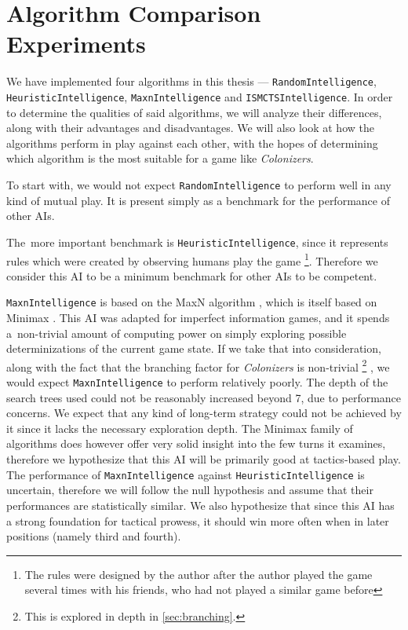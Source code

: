\section{Algorithm Comparison Experiments}

We have implemented four algorithms in this thesis --- \texttt{RandomIntelligence},
\texttt{HeuristicIntelligence}, \texttt{MaxnIntelligence} and \texttt{ISMCTSIntelligence}.
In order to determine the qualities of said algorithms, we will analyze their differences,
along with their advantages and disadvantages. We will also look at how the algorithms
perform in play against each other, with the hopes of determining which algorithm
is the most suitable for a game like \emph{Colonizers}.

To start with, we would not expect \texttt{RandomIntelligence} to perform well in any
kind of mutual play. It is present simply as a benchmark for the performance of
other AIs.

The~more important benchmark is \texttt{HeuristicIntelligence}, since it represents
rules which were created by observing humans play the game
\footnote{The rules were designed by the author after the author played the game
several times with his friends, who had not played a similar game before}.
Therefore we consider this
AI to be a minimum benchmark for other AIs to be competent.

\texttt{MaxnIntelligence} is based on the MaxN algorithm \cite{Luckhardt86}, which
is itself based on Minimax \cite{Millington09}. This AI was adapted for imperfect
information games, and it spends a~non-trivial amount of computing power
on simply exploring possible determinizations of the current game state.
If we take that into consideration, along with the fact that the branching factor
for \emph{Colonizers} is non-trivial
\footnote{This is explored in depth in \autoref{sec:branching}.}
, we would expect \texttt{MaxnIntelligence}
to perform relatively poorly. The depth of the search trees used could not be
reasonably increased beyond 7, due to performance concerns. We expect that any kind of
long-term strategy could not be achieved by it since it lacks the necessary
exploration depth. The Minimax family of algorithms does however offer very
solid insight into the few turns it examines, therefore we hypothesize that this AI will be
primarily good at tactics-based play. The performance of \texttt{MaxnIntelligence}
against \texttt{HeuristicIntelligence} is uncertain, therefore we will follow the null
hypothesis and assume that their performances are statistically similar.
We also hypothesize that since this AI has a strong foundation for tactical prowess,
it should win more often when in later positions (namely third and fourth).

